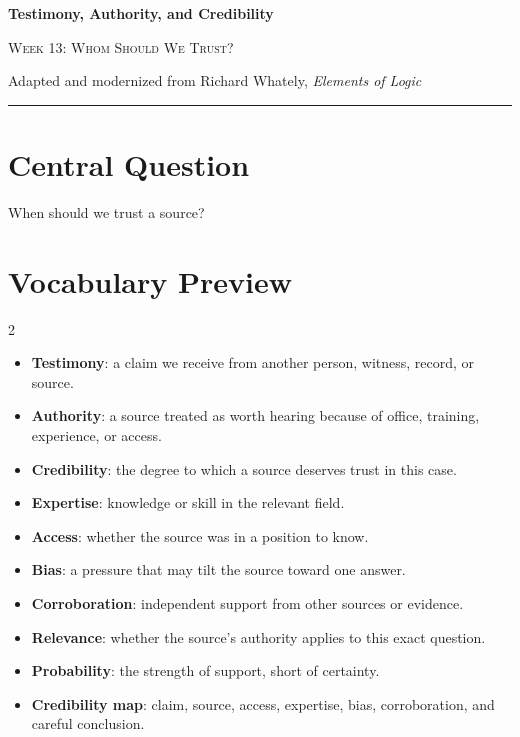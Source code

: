 \documentclass[12pt]{article}
\begin{document}
\begin{center}
{\LARGE\bfseries Testimony, Authority, and Credibility}\par\vspace{0.25em}
{\large\scshape Week 13: Whom Should We Trust?}\par\vspace{0.5em}
{Adapted and modernized from Richard Whately, \textit{Elements of Logic}}\par\vspace{0.6em}
\rule{0.82\textwidth}{0.4pt}
\end{center}

\section*{Central Question}
When should we trust a source?

\section*{Vocabulary Preview}
\begin{multicols}{2}
\begin{itemize}[leftmargin=*, itemsep=0.18em]
\item \textbf{Testimony}: a claim we receive from another person, witness, record, or source.
\item \textbf{Authority}: a source treated as worth hearing because of office, training, experience, or access.
\item \textbf{Credibility}: the degree to which a source deserves trust in this case.
\item \textbf{Expertise}: knowledge or skill in the relevant field.
\item \textbf{Access}: whether the source was in a position to know.
\item \textbf{Bias}: a pressure that may tilt the source toward one answer.
\item \textbf{Corroboration}: independent support from other sources or evidence.
\item \textbf{Relevance}: whether the source's authority applies to this exact question.
\item \textbf{Probability}: the strength of support, short of certainty.
\item \textbf{Credibility map}: claim, source, access, expertise, bias, corroboration, and careful conclusion.
\end{itemize}
\end{multicols}
\end{document}

